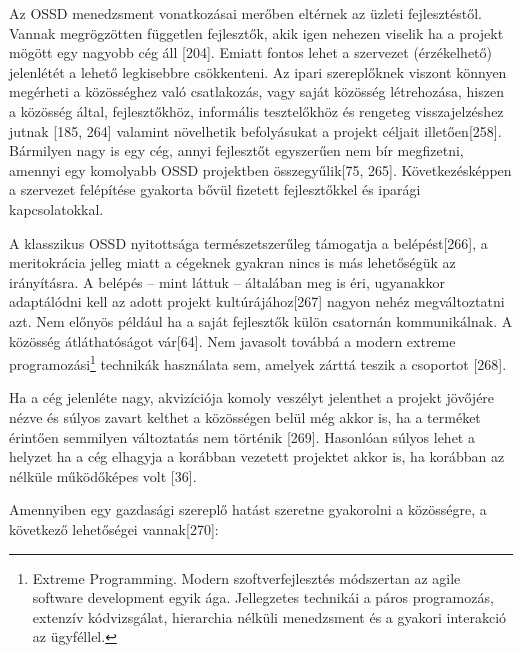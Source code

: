 \documentclass[12pt,magyar,a4paper,oneside]{scrreprt}
\begin{document}
Az OSSD menedzsment vonatkozásai merőben eltérnek az üzleti
fejlesztéstől. Vannak megrögzötten független fejlesztők, akik igen
nehezen viselik ha a projekt mögött egy nagyobb cég áll {[}204{]}.
Emiatt fontos lehet a szervezet (érzékelhető) jelenlétét a lehető
legkisebbre csökkenteni. Az ipari szereplőknek viszont könnyen megérheti
a közösséghez való csatlakozás, vagy saját közösség létrehozása, hiszen
a közösség által, fejlesztőkhöz, informális tesztelőkhöz és rengeteg
visszajelzéshez jutnak {[}185, 264{]} valamint növelhetik befolyásukat a
projekt céljait illetően{[}258{]}. Bármilyen nagy is egy cég, annyi
fejlesztőt egyszerűen nem bír megfizetni, amennyi egy komolyabb OSSD
projektben összegyűlik{[}75, 265{]}. Következésképpen a szervezet
felépítése gyakorta bővül fizetett fejlesztőkkel és iparági
kapcsolatokkal.

A klasszikus OSSD nyitottsága természetszerűleg támogatja a
belépést{[}266{]}, a meritokrácia jelleg miatt a cégeknek gyakran nincs
is más lehetőségük az irányításra. A belépés -- mint láttuk -- általában
meg is éri, ugyanakkor adaptálódni kell az adott projekt
kultúrájához{[}267{]} nagyon nehéz megváltoztatni azt. Nem előnyös
például ha a saját fejlesztők külön csatornán kommunikálnak. A közösség
átláthatóságot vár{[}64{]}. Nem javasolt továbbá a modern extreme
programozási\footnote{Extreme Programming. Modern szoftverfejlesztés
  módszertan az agile software development egyik ága. Jellegzetes
  technikái a páros programozás, extenzív kódvizsgálat, hierarchia
  nélküli menedzsment és a gyakori interakció az ügyféllel.} technikák
használata sem, amelyek zárttá teszik a csoportot {[}268{]}.

Ha a cég jelenléte nagy, akvizíciója komoly veszélyt jelenthet a projekt
jövőjére nézve és súlyos zavart kelthet a közösségen belül még akkor is,
ha a terméket érintően semmilyen változtatás nem történik {[}269{]}.
Hasonlóan súlyos lehet a helyzet ha a cég elhagyja a korábban vezetett
projektet akkor is, ha korábban az nélküle működőképes volt {[}36{]}.

Amennyiben egy gazdasági szereplő hatást szeretne gyakorolni a
közösségre, a következő lehetőségei vannak{[}270{]}:
\end{document}
